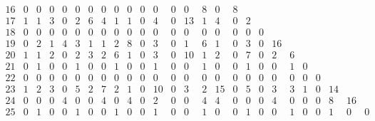 \begin{landscape}
\[\begin{array}{c|ccccccccccccccccccccccccc}
16&  0&  0&  0&  0&  0&  0&  0&  0&  0&  0&  0&  0&  0&  8&  0&  8&   &   &   &   &   &   &   &   &   \\
17&  1&  1&  3&  0&  2&  6&  4&  1&  1&  0&  4&  0& 13&  1&  4&  0&  2&   &   &   &   &   &   &   &   \\
18&  0&  0&  0&  0&  0&  0&  0&  0&  0&  0&  0&  0&  0&  0&  0&  0&  0&  0&   &   &   &   &   &   &   \\
19&  0&  2&  1&  4&  3&  1&  1&  2&  8&  0&  3&  0&  1&  6&  1&  0&  3&  0& 16&   &   &   &   &   &   \\
20&  1&  1&  2&  0&  2&  3&  2&  6&  1&  0&  3&  0& 10&  1&  2&  0&  7&  0&  2&  6&   &   &   &   &   \\
21&  0&  1&  0&  0&  1&  0&  0&  1&  0&  0&  1&  0&  0&  1&  0&  0&  1&  0&  0&  1&  0&   &   &   &   \\
22&  0&  0&  0&  0&  0&  0&  0&  0&  0&  0&  0&  0&  0&  0&  0&  0&  0&  0&  0&  0&  0&  0&   &   &   \\
23&  1&  2&  3&  0&  5&  2&  7&  2&  1&  0& 10&  0&  3&  2& 15&  0&  5&  0&  3&  3&  1&  0& 14&   &   \\
24&  0&  0&  0&  4&  0&  0&  4&  0&  4&  0&  2&  0&  0&  4&  4&  0&  0&  0&  4&  0&  0&  0&  8& 16&   \\
25&  0&  1&  0&  0&  1&  0&  0&  1&  0&  0&  1&  0&  0&  1&  0&  0&  1&  0&  0&  1&  0&  0&  1&  0&  0\\
\end{array}
\]


\end{landscape}
